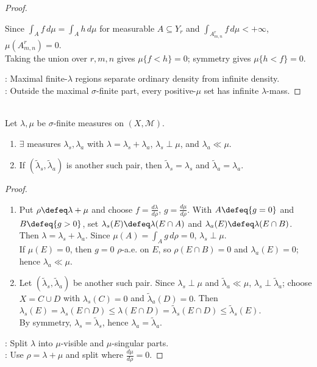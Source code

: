 \begin{theorem}
\begin{proof}
\begin{enumerate}[label=(\roman*)]
Since $\int_Af\,d\mu=\int_Ah\,d\mu$ for measurable $A\subseteq Y_r$ and $\int_{A_{m,n}^r}f\,d\mu<+\infty$, $\mu(A_{m,n}^r)=0$.\\
Taking the union over $r,m,n$ gives $\mu\{f<h\}=0$; symmetry gives $\mu\{h<f\}=0$.
\end{enumerate}
: Maximal finite-$\lambda$ regions separate ordinary density from infinite density.\\
: Outside the maximal $\sigma$-finite part, every positive-$\mu$ set has infinite $\lambda$-mass.
\end{proof}
\end{theorem}

\begin{theorem} \label{thm:lebesgue-decomposition-measures} \\
Let $\lambda,\mu$ be $\sigma$-finite measures on $(X,\mathcal{M})$.
\begin{enumerate}[label=(\roman*)]
\setlength{\itemsep}{0pt}
\item $\exists$ measures $\lambda_s,\lambda_a$ with $\lambda=\lambda_s+\lambda_a$, $\lambda_s\perp\mu$, and $\lambda_a\ll\mu$.
\item If $(\tilde{\lambda}_s,\tilde{\lambda}_a)$ is another such pair, then $\tilde{\lambda}_s=\lambda_s$ and $\tilde{\lambda}_a=\lambda_a$.
\end{enumerate}
\begin{proof}
\begin{enumerate}[label=(\roman*)]
\setlength{\itemsep}{0pt}
\item Put $\rho\defeq\lambda+\mu$ and choose $f=\frac{d\lambda}{d\rho}$, $g=\frac{d\mu}{d\rho}$. With $A\defeq\{g=0\}$ and $B\defeq\{g>0\}$, set $\lambda_s(E)\defeq\lambda(E\cap A)$ and $\lambda_a(E)\defeq\lambda(E\cap B)$. Then $\lambda=\lambda_s+\lambda_a$. Since $\mu(A)=\int_Ag\,d\rho=0$, $\lambda_s\perp\mu$.\\
If $\mu(E)=0$, then $g=0$ $\rho$-a.e. on $E$, so $\rho(E\cap B)=0$ and $\lambda_a(E)=0$; hence $\lambda_a\ll\mu$.
\item Let $(\tilde{\lambda}_s,\tilde{\lambda}_a)$ be another such pair. Since $\lambda_s\perp\mu$ and $\tilde{\lambda}_a\ll\mu$, $\lambda_s\perp\tilde{\lambda}_a$; choose $X=C\cup D$ with $\lambda_s(C)=0$ and $\tilde{\lambda}_a(D)=0$. Then $\lambda_s(E)=\lambda_s(E\cap D)\leq\lambda(E\cap D)=\tilde{\lambda}_s(E\cap D)\leq\tilde{\lambda}_s(E)$.\\
By symmetry, $\lambda_s=\tilde{\lambda}_s$, hence $\lambda_a=\tilde{\lambda}_a$.
\end{enumerate}
: Split $\lambda$ into $\mu$-visible and $\mu$-singular parts.\\
: Use $\rho=\lambda+\mu$ and split where $\frac{d\mu}{d\rho}=0$.
\end{proof}
\end{theorem}

